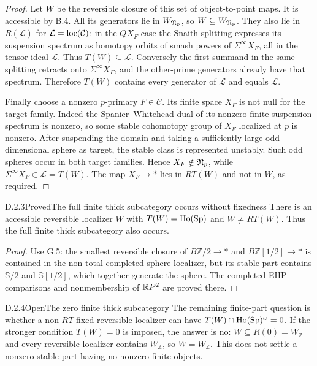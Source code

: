 \begin{proof}
Let $W$ be the reversible closure of this set of object-to-point maps. It is accessible by B.4. All its generators lie in $W_{\mathfrak N_p}$, so $W\subseteq W_{\mathfrak N_p}$. They also lie in $R(\mathcal L)$ for $\mathcal L=\operatorname{loc}(\mathcal C)$: in the $QX_F$ case the Snaith splitting expresses its suspension spectrum as homotopy orbits of smash powers of $\Sigma^\infty X_F$, all in the tensor ideal $\mathcal L$. Thus $T(W)\subseteq\mathcal L$. Conversely the first summand in the same splitting retracts onto $\Sigma^\infty X_F$, and the other-prime generators already have that spectrum. Therefore $T(W)$ contains every generator of $\mathcal L$ and equals $\mathcal L$.

Finally choose a nonzero $p$-primary $F\in\mathcal C$. Its finite space $X_F$ is not null for the target family. Indeed the Spanier--Whitehead dual of its nonzero finite suspension spectrum is nonzero, so some stable cohomotopy group of $X_F$ localized at $p$ is nonzero. After suspending the domain and taking a sufficiently large odd-dimensional sphere as target, the stable class is represented unstably. Such odd spheres occur in both target families. Hence $X_F\notin\mathfrak N_p$, while $\Sigma^\infty X_F\in\mathcal L=T(W)$. The map $X_F\to *$ lies in $RT(W)$ and not in $W$, as required.
\end{proof}

\begin{claim}{D.2.3}{Proved}{The full finite thick subcategory occurs without fixedness}
There is an accessible reversible localizer $W$ with $T(W)=\operatorname{Ho}(\mathrm{Sp})$ and $W\neq RT(W)$. Thus the full finite thick subcategory also occurs.
\end{claim}
\begin{proof}
Use G.5: the smallest reversible closure of $B\mathbb Z/2\to *$ and $B\mathbb Z[1/2]\to *$ is contained in the non-total completed-sphere localizer, but its stable part contains $\mathbb S/2$ and $\mathbb S[1/2]$, which together generate the sphere. The completed EHP comparisons and nonmembership of $\mathbb{R}P^2$ are proved there.
\end{proof}

\begin{claim}{D.2.4}{Open}{The zero finite thick subcategory}
The remaining finite-part question is whether a non-$RT$-fixed reversible localizer can have $T(W)\cap\operatorname{Ho}(\mathrm{Sp})^\omega=0$. If the stronger condition $T(W)=0$ is imposed, the answer is no: $W\subseteq R(0)=W_{\mathbb Z}$ and every reversible localizer contains $W_{\mathbb Z}$, so $W=W_{\mathbb Z}$. This does not settle a nonzero stable part having no nonzero finite objects.
\end{claim}

